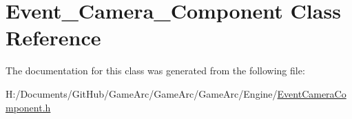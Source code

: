 \hypertarget{class_event___camera___component}{\section{Event\+\_\+\+Camera\+\_\+\+Component Class Reference}
\label{class_event___camera___component}
}


The documentation for this class was generated from the following file\+:\begin{DoxyCompactItemize}
\item 
H\+:/\+Documents/\+Git\+Hub/\+Game\+Arc/\+Game\+Arc/\+Game\+Arc/\+Engine/\hyperlink{_event_camera_component_8h}{Event\+Camera\+Component.\+h}\end{DoxyCompactItemize}
